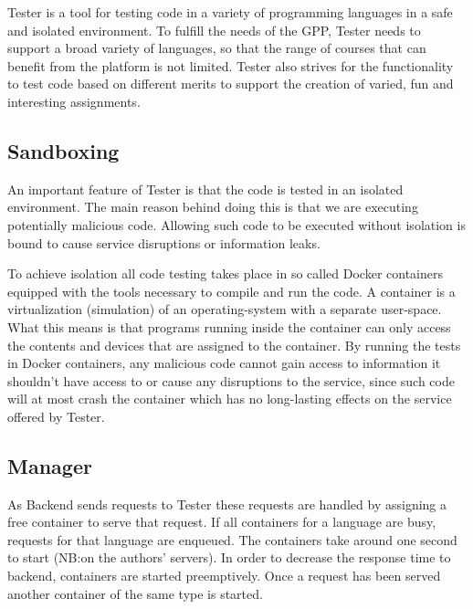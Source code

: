 Tester is a tool for testing code in a variety of programming languages in a safe and isolated environment. To fulfill the needs of the GPP, Tester needs to support a  broad variety of languages, so that the range of courses that can benefit from the platform is not limited. Tester also strives for the functionality to test code based on different merits to support the creation of varied, fun and interesting assignments.

\subsection{Sandboxing}
An important feature of Tester is that the code is tested in an isolated environment. The main reason behind doing this is that we are executing potentially malicious code. Allowing such code to be executed without isolation is bound to cause service disruptions or information leaks.

To achieve isolation all code testing takes place in so called Docker containers equipped with the tools necessary to compile and run the code. A container is a virtualization (simulation) of an operating-system with a separate user-space. What this means is that programs running inside the container can only access the contents and devices that are assigned to the container. By running the tests in Docker containers, any malicious code cannot gain access to information it shouldn't have access to or cause any disruptions to the service, since such code will at most crash the container which has no long-lasting effects on the service offered by Tester.
\subsection{Manager}

As Backend sends requests to Tester these requests are handled by assigning a free container to serve that request. If all containers for a language are busy, requests for that language are enqueued. The containers take around one second to start (NB:\@ on the authors' servers). In order to decrease the response time to backend, containers are started preemptively. Once a request has been served another container of the same type is started.

